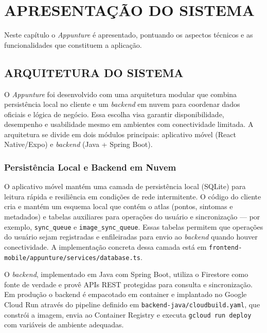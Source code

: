 \chapter{APRESENTAÇÃO DO SISTEMA} \label{cha:apresentacao}

Neste capítulo o \textit{Appunture} é apresentado, pontuando os aspectos técnicos e as funcionalidades que constituem a aplicação.

\section{ARQUITETURA DO SISTEMA} \label{sec:arq_sistema}

O \textit{Appunture} foi desenvolvido com uma arquitetura modular que combina persistência local no cliente e um \textit{backend} em nuvem para coordenar dados oficiais e lógica de negócio. Essa escolha visa garantir disponibilidade, desempenho e usabilidade mesmo em ambientes com conectividade limitada. A arquitetura se divide em dois módulos principais: aplicativo móvel (React Native/Expo) e \textit{backend} (Java + Spring Boot).

\subsection{Persistência Local e Backend em Nuvem}

O aplicativo móvel mantém uma camada de persistência local (SQLite) para leitura rápida e resiliência em condições de rede intermitente. O código do cliente cria e mantém um esquema local que contém o atlas (pontos, sintomas e metadados) e tabelas auxiliares para operações do usuário e sincronização — por exemplo, \texttt{sync\_queue} e \texttt{image\_sync\_queue}. Essas tabelas permitem que operações do usuário sejam registradas e enfileiradas para envio ao \textit{backend} quando houver conectividade. A implementação concreta dessa camada está em \texttt{frontend-mobile/appunture/services/database.ts}.

O \textit{backend}, implementado em Java com Spring Boot, utiliza o Firestore como fonte de verdade e provê APIs REST protegidas para consulta e sincronização. Em produção o backend é empacotado em container e implantado no Google Cloud Run através do pipeline definido em \texttt{backend-java/cloudbuild.yaml}, que constrói a imagem, envia ao Container Registry e executa \texttt{gcloud run deploy} com variáveis de ambiente adequadas.

